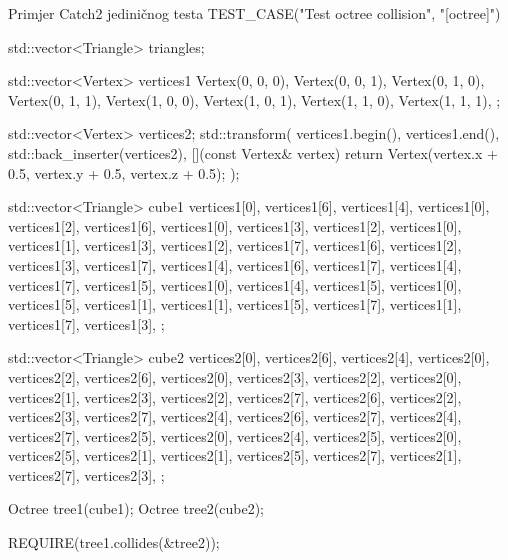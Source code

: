 \begin{cppSource}{Primjer Catch2 jediničnog testa}
TEST_CASE("Test octree collision", "[octree]") {
    std::vector<Triangle> triangles;

    std::vector<Vertex> vertices1{
        Vertex(0, 0, 0),
        Vertex(0, 0, 1),
        Vertex(0, 1, 0),
        Vertex(0, 1, 1),
        Vertex(1, 0, 0),
        Vertex(1, 0, 1),
        Vertex(1, 1, 0),
        Vertex(1, 1, 1),
    };

    std::vector<Vertex> vertices2;
    std::transform(
        vertices1.begin(),
        vertices1.end(),
        std::back_inserter(vertices2),
        [](const Vertex& vertex) {
            return Vertex(vertex.x + 0.5, vertex.y + 0.5, vertex.z + 0.5);
        }
    );

    std::vector<Triangle> cube1{
        {vertices1[0], vertices1[6], vertices1[4]},
        {vertices1[0], vertices1[2], vertices1[6]},
        {vertices1[0], vertices1[3], vertices1[2]},
        {vertices1[0], vertices1[1], vertices1[3]},
        {vertices1[2], vertices1[7], vertices1[6]},
        {vertices1[2], vertices1[3], vertices1[7]},
        {vertices1[4], vertices1[6], vertices1[7]},
        {vertices1[4], vertices1[7], vertices1[5]},
        {vertices1[0], vertices1[4], vertices1[5]},
        {vertices1[0], vertices1[5], vertices1[1]},
        {vertices1[1], vertices1[5], vertices1[7]},
        {vertices1[1], vertices1[7], vertices1[3]},
    };

    std::vector<Triangle> cube2{
        {vertices2[0], vertices2[6], vertices2[4]},
        {vertices2[0], vertices2[2], vertices2[6]},
        {vertices2[0], vertices2[3], vertices2[2]},
        {vertices2[0], vertices2[1], vertices2[3]},
        {vertices2[2], vertices2[7], vertices2[6]},
        {vertices2[2], vertices2[3], vertices2[7]},
        {vertices2[4], vertices2[6], vertices2[7]},
        {vertices2[4], vertices2[7], vertices2[5]},
        {vertices2[0], vertices2[4], vertices2[5]},
        {vertices2[0], vertices2[5], vertices2[1]},
        {vertices2[1], vertices2[5], vertices2[7]},
        {vertices2[1], vertices2[7], vertices2[3]},
    };

    Octree tree1(cube1);
    Octree tree2(cube2);

    REQUIRE(tree1.collides(&tree2));
}
\end{cppSource}